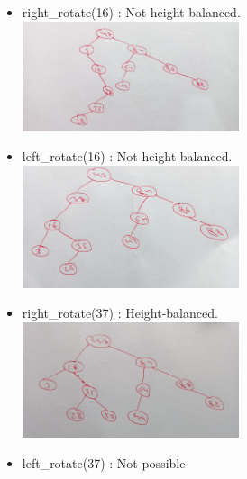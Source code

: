 \documentclass[12pt,twoside]{article}
\begin{document}
\begin{problems}
\begin{problemparts}
\newpage
\problempart %
\begin{itemize}
    \item right\_rotate(16) : Not height-balanced.\\
    \includegraphics[width=0.5\textwidth]{rr_16.jpg} \\
    \item left\_rotate(16) : Not height-balanced.\\
    \includegraphics[width=0.5\textwidth]{lr_16.jpg} \\
    \item right\_rotate(37) : Height-balanced.\\
    \includegraphics[width=0.5\textwidth]{rr_37.jpg} \\
    \item left\_rotate(37) : Not possible
\end{itemize}
\end{problemparts}


\end{problems}
\end{document}

